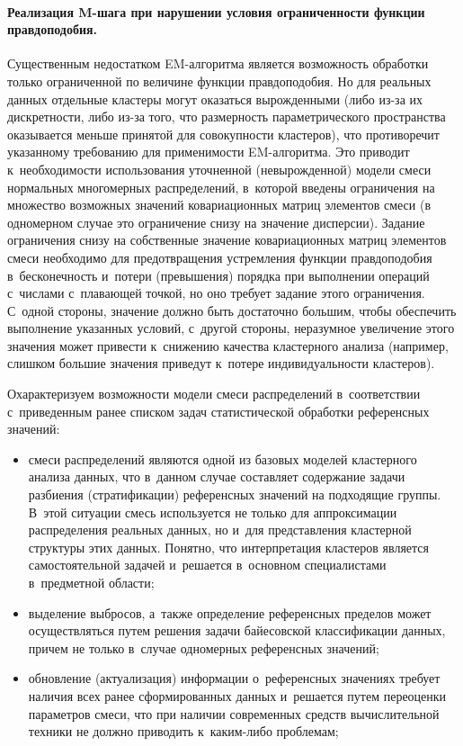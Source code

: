 \begin{multicols}{2}
\vspace*{-6pt}

     \paragraph*{Реализация M-шага при нарушении условия
ограниченности функции правдоподобия.} Существенным недостатком
     EM-ал\-го\-рит\-ма является возможность обработки только ограниченной
по величине функции правдоподобия. Но для реальных данных отдельные
кластеры могут оказаться вырожденными (либо из-за их дискретности, либо
из-за того, что размерность параметрического пространства оказывается меньше
принятой для совокупности клас\-те\-ров), что противоречит указанному
требованию для применимости EM-ал\-го\-рит\-ма. Это приводит\linebreak
 к~необходимости использования уточненной (невырож\-ден\-ной) модели смеси
нормальных многомерных распределений, в~которой введены ограничения на
множество возможных значений ковариацион\-ных матриц элементов смеси (в
одномерном случае это ограничение снизу на значение дисперсии). Задание
ограничения снизу на собственные значение ковариационных матриц
элементов смеси необходимо для предотвращения устремления функции
правдоподобия в~бесконечность и~потери (превышения) порядка при
выполнении операций с~числами с~плавающей точкой, но оно требует задание
этого ограничения. С~одной стороны, значение должно быть достаточно
большим, чтобы обеспечить выполнение указанных условий, с~другой стороны,
неразумное увеличение этого значения может привести к~снижению качества
кластерного анализа (например, слишком большие значения приведут к~потере
индивидуальности кластеров).

     Охарактеризуем возможности модели смеси распределений в~соответствии с~приведенным ранее списком задач статистической обработки
референсных значений:
     \begin{itemize}
\item смеси распределений являются одной из базовых моделей кластерного
анализа данных, что в~данном случае составляет содержание задачи
разбиения (стратификации) референсных значений на подходящие группы.
В~этой ситуации смесь используется не только для аппроксимации
распределения реальных данных, но и~для представления кластерной
структуры этих данных. Понятно, что интерпретация кластеров является
самостоятельной задачей и~решается в~основном специалистами в~предметной об\-ласти;\\[-9pt]
\item выделение выбросов, а~также определение референсных пределов
может осуществляться \mbox{путем} решения задачи байесовской классификации
данных, причем не только в~случае одномерных референсных значений;\\[-9pt]
\item обновление (актуализация) информации о~референсных значениях
требует наличия всех ранее сформированных данных и~решается путем
переоценки параметров смеси, что при наличии современных средств
вычислительной техники не должно приводить к~ка\-ким-ли\-бо проб\-лемам;
{

}
\end{itemize}
\end{multicols}
